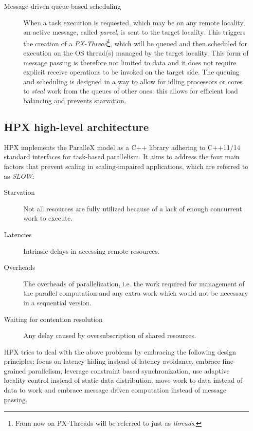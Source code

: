 \begin{description}
	\item [Message-driven queue-based scheduling] When a task execution is requested, which may be on any remote locality, an active message, called \emph{parcel}, is sent to the target locality. This triggers the creation of a \emph{PX-Thread}\footnote{From now on PX-Threads will be referred to just as \emph{threads}.}, which will be queued and then scheduled for execution on the OS thread(s) managed by the target locality. This form of message passing is therefore not limited to data and it does not require explicit receive operations to be invoked on the target side. The queuing and scheduling is designed in a way to allow for idling processors or cores to \emph{steal} work from the queues of other ones: this allows for efficient load balancing and prevents starvation.
\end{description}


\subsection{HPX high-level architecture}
HPX implements the ParalleX model as a C++ library adhering to C++11/14 standard interfaces for task-based parallelism.
It aims to address the four main factors that prevent scaling in scaling-impaired applications, which are referred to as \emph{SLOW}\cite{kaiser2014hpx}:
\begin{description}
	\item [Starvation] Not all resources are fully utilized because of a lack of enough concurrent work to execute.
	\item [Latencies] Intrinsic delays in accessing remote resources.
	\item [Overheads] The overheads of parallelization, i.e. the work required for management of the parallel computation and any extra work which would not be necessary in a sequential version.
	\item [Waiting for contention resolution] Any delay caused by oversubscription of shared resources.
\end{description}

HPX tries to deal with the above problems by embracing the following design principles: focus on latency hiding instead of latency avoidance, embrace fine-grained parallelism, leverage constraint based synchronization, use adaptive locality control instead of static data distribution, move work to data instead of data to work and embrace message driven computation instead of message passing.\cite{kaiser2014hpx}

